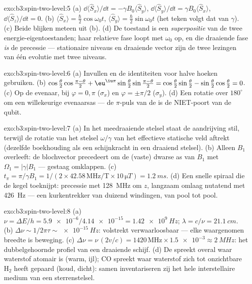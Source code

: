 \begin{solution}{exo:b3:spin-two-level:5}
(a) $\dd\langle\hat S_x\rangle/\dd t = -\gamma B_0\langle\hat
S_y\rangle$, $\dd\langle\hat S_y\rangle/\dd t = \gamma
B_0\langle\hat S_x\rangle$, $\dd\langle\hat S_z\rangle/\dd t = 0$.
(b) $\langle\hat S_x\rangle = \tfrac\hbar2\cos\omega_0t$,
$\langle\hat S_y\rangle = \tfrac\hbar2\sin\omega_0t$ (het teken volgt dat
van $\gamma$). (c) Beide blijken meteen uit (b). (d) De toestand is een
\emph{superpositie} van de twee energie-eigentoestanden; haar relatieve
fase loopt met $\omega_0$ op, en die draaiende fase \emph{is} de
precessie --- stationaire niveaus en draaiende vector zijn de twee
lezingen van één evolutie met twee niveaus.
\end{solution}

\begin{solution}{exo:b3:spin-two-level:6}
(a) Invullen en de identiteiten voor halve hoeken gebruiken. (b)
$\cos\tfrac\theta2\cos\tfrac{\pi-\theta}2 +
\eu^{\iu\pi}\sin\tfrac\theta2\sin\tfrac{\pi-\theta}2 =
\cos\tfrac\theta2\sin\tfrac\theta2 -
\sin\tfrac\theta2\cos\tfrac\theta2 = 0$. (c) Op de evenaar, bij
$\varphi = 0, \pi$ ($\sigma_x$) en $\varphi = \pm\pi/2$
($\sigma_y$). (d) Een rotatie over $180^\circ$ om een willekeurige
evenaarsas --- de $\pi$-puls van de  is de
NIET-poort van de qubit.
\end{solution}

\begin{solution}{exo:b3:spin-two-level:7}
(a) In het meedraaiende stelsel staat de aandrijving stil, terwijl de
rotatie van het stelsel $\omega/\gamma$ van het effectieve statische veld
aftrekt (dezelfde boekhouding als een schijnkracht in een draaiend
stelsel). (b) Alleen $B_1$ overleeft: de blochvector precedeert om de
(vaste) dwarse as van $B_1$ met $\Omega_1 = |\gamma|B_1$ --- gestaag
omklappen. (c) $t_\pi = \pi/\gamma B_1 = 1/(2 \times 42.58\,\text{
MHz/T} \times 10\,\unit{\micro T}) = \qty{1.2}{ms}$. (d) Een snelle
spiraal die de kegel toeknijpt: precessie met \qty{128}{MHz} om $z$,
langzaam omlaag nutatend met \qty{426}{Hz} --- een kurkentrekker van
duizend windingen, van pool tot pool.
\end{solution}

\begin{solution}{exo:b3:spin-two-level:8}
(a) $\nu = \Delta E/h = \num{5.9e-6}/\num{4.14e-15} =
\qty{1.42e9}{Hz}$; $\lambda = c/\nu = \qty{21.1}{cm}$. (b) $\Delta
\nu \sim 1/2\pi\tau \sim \qty{e-15}{Hz}$: volstrekt verwaarloosbaar ---
elke waargenomen breedte is beweging. (c) $\Delta\nu =
\nu\,(2v/c) = 1420\,\text{MHz} \times \num{1.5e-3} \approx
\qty{2}{MHz}$: het dubbelgehoornde profiel van een draaiende schijf. (d)
De  spreekt overal waar waterstof atomair is (warm, ijl); CO
spreekt waar waterstof zich tot onzichtbare H$_2$ heeft gepaard (koud,
dicht): samen inventariseren zij het hele interstellaire medium van een
sterrenstelsel.
\end{solution}


